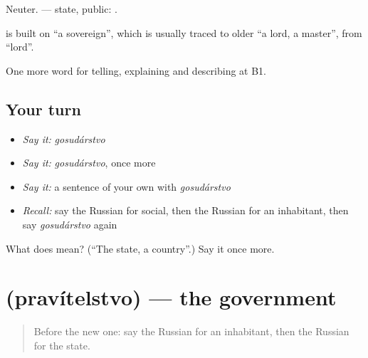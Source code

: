 Neuter. \emph{} — state, public: \emph{ }.

\begin{cousinweb}
\textbf{} is built on \emph{} \textquotedblleft{}a sovereign\textquotedblright{}, which is usually traced to older \emph{} \textquotedblleft{}a lord, a master\textquotedblright{}, from \emph{} \textquotedblleft{}lord\textquotedblright{}.
\end{cousinweb}

\begin{grammarlens}[title={What you've built}]
One more word for telling, explaining and describing at B1.
\end{grammarlens}

\subsection*{Your turn}
\begin{itemize}
\raggedright
  \item \emph{Say it:} \emph{gosudárstvo}
  \item \emph{Say it:} \emph{gosudárstvo}, once more
  \item \emph{Say it:} a sentence of your own with \emph{gosudárstvo}
  \item \emph{Recall:} say the Russian for social, then the Russian for an inhabitant, then say \emph{gosudárstvo} again
\end{itemize}

\begin{tcolorbox}[breakable,colback=teal!4,colframe=teal!35!black,title={Before you move on}]
What does  mean? (\textquotedblleft{}The state, a country\textquotedblright{}.) Say it once more.
\end{tcolorbox}
\section[\texorpdfstring{\ru{правительство} (pravítelstvo)}{правительство (pravítelstvo)}]{ (pravítelstvo) — the government}

\label{lesson:RU-C365-pravitelstvo}



\begin{quote}
Before the new one: say the Russian for an inhabitant, then the Russian for the state.
\end{quote}

